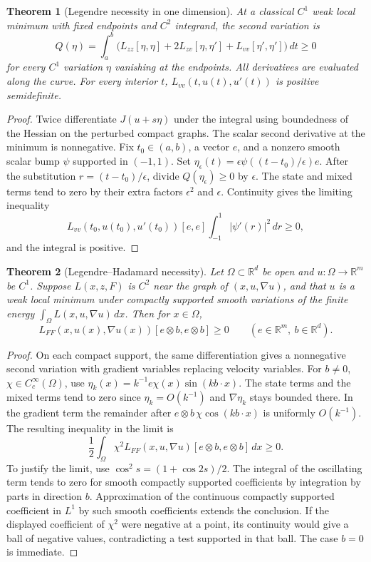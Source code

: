 \documentclass[11pt,oneside,openany]{book}
\theoremstyle{plain}
\newtheorem{theorem}{Theorem}[chapter]
\theoremstyle{definition}
\theoremstyle{remark}
\begin{document}
\begin{theorem}[Legendre necessity in one dimension]
\label{thm:v07-05-01}
At a classical \(C^1\) weak local minimum with fixed endpoints
and \(C^2\) integrand, the second variation is
\[
 Q(\eta)=\int_a^b
 \bigl(L_{zz}[\eta,\eta]+2L_{zv}[\eta,\eta']
                         +L_{vv}[\eta',\eta']\bigr)\,dt\ge0
\]
for every \(C^1\) variation \(\eta\) vanishing at the endpoints.
All derivatives are evaluated along the curve. For every
interior \(t\), \(L_{vv}(t,u(t),u'(t))\) is positive semidefinite.
\end{theorem}
\begin{proof}
Twice differentiate \(J(u+s\eta)\) under the integral using
boundedness of the Hessian on the perturbed compact graphs.
The scalar second derivative at the minimum is nonnegative.
Fix \(t_0\in(a,b)\), a vector \(e\), and a nonzero smooth
scalar bump \(\psi\) supported in \((-1,1)\). Set
\(\eta_\epsilon(t)=\epsilon\psi((t-t_0)/\epsilon)e\).
After the substitution \(r=(t-t_0)/\epsilon\), divide
\(Q(\eta_\epsilon)\ge0\) by \(\epsilon\). The state and mixed
terms tend to zero by their extra factors \(\epsilon^2\) and
\(\epsilon\). Continuity gives the limiting inequality
\[
 L_{vv}(t_0,u(t_0),u'(t_0))[e,e]\int_{-1}^1|\psi'(r)|^2\,dr\ge0,
\]
and the integral is positive.
\end{proof}

\begin{theorem}[Legendre--Hadamard necessity]
\label{thm:v07-05-02}
Let \(\Omega\subset\mathbb R^d\) be open and \(u:\Omega\to\mathbb R^m\)
be \(C^1\). Suppose \(L(x,z,F)\) is \(C^2\) near the graph of
\((x,u,\nabla u)\), and that \(u\) is a weak local minimum under
compactly supported smooth variations of the finite energy
\(\int_\Omega L(x,u,\nabla u)\,dx\). Then for \(x\in\Omega\),
\[
 L_{FF}(x,u(x),\nabla u(x))[e\otimes b,e\otimes b]\ge0
 \qquad(e\in\mathbb R^m,\ b\in\mathbb R^d).
\]
\end{theorem}
\begin{proof}
On each compact support, the same differentiation gives a
nonnegative second variation with gradient variables replacing
velocity variables. For \(b\ne0\), \(\chi\in C_c^\infty(\Omega)\),
use \(\eta_k(x)=k^{-1}e\chi(x)\sin(k b\cdot x)\).
The state terms and the mixed terms tend to zero since
\(\eta_k=O(k^{-1})\) and \(\nabla\eta_k\) stays bounded there.
In the gradient term the remainder after
\(e\otimes b\,\chi\cos(k b\cdot x)\) is uniformly \(O(k^{-1})\).
The resulting inequality in the limit is
\[
 \frac12\int_\Omega \chi^2 L_{FF}(x,u,\nabla u)
                     [e\otimes b,e\otimes b]\,dx\ge0.
\]
To justify the limit, use \(\cos^2 s=(1+\cos 2s)/2\).
The integral of the oscillating term tends to zero for smooth
compactly supported coefficients by integration by parts in
direction \(b\). Approximation of the continuous compactly
supported coefficient in \(L^1\) by such smooth coefficients
extends the conclusion. If the displayed coefficient of
\(\chi^2\) were negative at a point, its continuity would give
a ball of negative values, contradicting a test supported in
that ball. The case \(b=0\) is immediate.
\end{proof}
\end{document}
